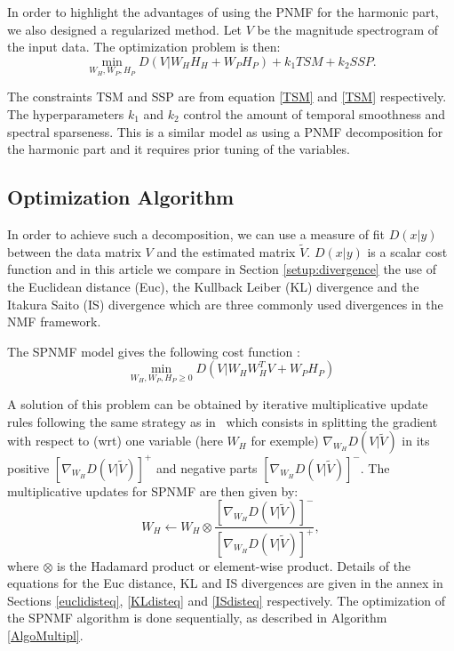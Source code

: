 In order to highlight the advantages of using the PNMF for the harmonic part, we also designed a regularized method. Let $V$ be the magnitude spectrogram of the input data. The optimization problem is then:
\begin{equation}
\min_{W_{H},W_{P},H_{P}}D(V|W_HH_H + W_P  H_P) + k_1 TSM + k_2 SSP.
\end{equation} 

The constraints TSM and SSP are from equation \eqref{TSM} and \eqref{TSM} respectively. The hyperparameters $k_1$ and $k_2$ control the amount of temporal smoothness and spectral sparseness. This is a similar model as using a PNMF decomposition for the harmonic part and it requires prior tuning of the variables. 


\subsection{Optimization Algorithm}

In order to achieve such a decomposition, we can use a measure of fit $D(x|y)$ between the data matrix $V$ and the estimated matrix $\tilde{V}$. $D(x|y)$ is a scalar cost function and in this article we compare in Section \ref{setup:divergence} the use of the Euclidean distance (Euc), the Kullback Leiber (KL) divergence and the Itakura Saito (IS) divergence which are three commonly used divergences in the NMF framework.



The SPNMF model gives the following cost function : 
\begin{equation}\label{InitCost}
\min_{W_H,W_P,H_P \geq 0} D(V|W_{H}W_{H}^{T}V + W_{P} H_{P})  
\end{equation}

A solution of this problem can be obtained by iterative multiplicative update rules following the same strategy as in~\cite{yuanOja2005,Lee01algorithmsfor} which consists in splitting the gradient with respect to (wrt) one variable (here $W_H$ for exemple) $\nabla_{W_H} D(V|\tilde{V})$ in its positive $[\nabla_{W_H} D(V|\tilde{V})]^{+}$ and negative parts $[\nabla_{W_H} D(V|\tilde{V})]^{-}$.
The multiplicative updates for SPNMF are then given by: 
$$W_{H} \leftarrow W_{H} \otimes \frac{ [\nabla_{W_H} D(V|\tilde{V})]^{-} }{[\nabla_{W_H} D(V|\tilde{V})]^{+}}, $$
where $\otimes$ is the Hadamard product or element-wise product. Details of the equations for the Euc distance, KL and IS divergences are given in the annex in Sections \ref{euclidisteq}, \ref{KLdisteq} and \ref{ISdisteq} respectively. 
The optimization of the SPNMF algorithm is done sequentially, as described in Algorithm \ref{AlgoMultipl}.

